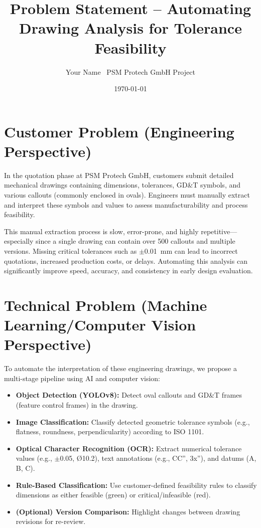 \documentclass[a4paper,12pt]{article}
\title{\textbf{Problem Statement – Automating Drawing Analysis for Tolerance Feasibility}} \author{Your Name \ PSM Protech GmbH Project} \date{\today}
\begin{document}
\maketitle

\section*{Customer Problem (Engineering Perspective)}

In the quotation phase at PSM Protech GmbH, customers submit detailed mechanical drawings containing dimensions, tolerances, GD&T symbols, and various callouts (commonly enclosed in ovals). Engineers must manually extract and interpret these symbols and values to assess manufacturability and process feasibility.

This manual extraction process is slow, error-prone, and highly repetitive—especially since a single drawing can contain over 500 callouts and multiple versions. Missing critical tolerances such as $\pm$0.01~mm can lead to incorrect quotations, increased production costs, or delays. Automating this analysis can significantly improve speed, accuracy, and consistency in early design evaluation.

\section*{Technical Problem (Machine Learning/Computer Vision Perspective)}

To automate the interpretation of these engineering drawings, we propose a multi-stage pipeline using AI and computer vision:

\begin{itemize} \item \textbf{Object Detection (YOLOv8):} Detect oval callouts and GD&T frames (feature control frames) in the drawing. \item \textbf{Image Classification:} Classify detected geometric tolerance symbols (e.g., flatness, roundness, perpendicularity) according to ISO 1101. \item \textbf{Optical Character Recognition (OCR):} Extract numerical tolerance values (e.g., $\pm$0.05, \O10.2), text annotations (e.g., CC'', 3x''), and datums (A, B, C). \item \textbf{Rule-Based Classification:} Use customer-defined feasibility rules to classify dimensions as either feasible (green) or critical/infeasible (red). \item \textbf{(Optional) Version Comparison:} Highlight changes between drawing revisions for re-review. \end{itemize}
\end{document}
